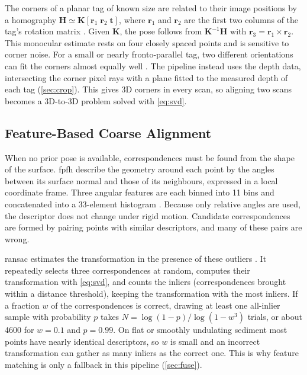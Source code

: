 The corners of a planar tag of known size are related to their image positions by a homography $\mathbf{H}\simeq\mathbf{K}[\mathbf{r}_1\;\mathbf{r}_2\;\mathbf{t}]$, where $\mathbf{r}_1$ and $\mathbf{r}_2$ are the first two columns of the tag's rotation matrix \cite{zhangFlexibleNewTechnique2000,hartley2003multiple}. Given $\mathbf{K}$, the pose follows from $\mathbf{K}^{-1}\mathbf{H}$ with $\mathbf{r}_3=\mathbf{r}_1\times\mathbf{r}_2$. This monocular estimate rests on four closely spaced points and is sensitive to corner noise. For a small or nearly fronto-parallel tag, two different orientations can fit the corners almost equally well \cite{schweighoferRobustPoseEstimation2006}. The pipeline instead uses the depth data, intersecting the corner pixel rays with a plane fitted to the measured depth of each tag (\autoref{sec:crop}). This gives 3D corners in every scan, so aligning two scans becomes a 3D-to-3D problem solved with \autoref{eq:svd}.

\subsection{Feature-Based Coarse Alignment}
\label{sec:theory_fpfh}
When no prior pose is available, correspondences must be found from the shape of the surface. \gls{fpfh} describe the geometry around each point by the angles between its surface normal and those of its neighbours, expressed in a local coordinate frame. Three angular features are each binned into 11 bins and concatenated into a 33-element histogram \cite{rusuFastPointFeature2009}. Because only relative angles are used, the descriptor does not change under rigid motion. Candidate correspondences are formed by pairing points with similar descriptors, and many of these pairs are wrong.

\Gls{ransac} estimates the transformation in the presence of these outliers \cite{fischlerRandomSampleConsensus1981}. It repeatedly selects three correspondences at random, computes their transformation with \autoref{eq:svd}, and counts the inliers (correspondences brought within a distance threshold), keeping the transformation with the most inliers. If a fraction $w$ of the correspondences is correct, drawing at least one all-inlier sample with probability $p$ takes $N=\log(1-p)/\log(1-w^{3})$ trials, or about 4600 for $w=0.1$ and $p=0.99$. On flat or smoothly undulating sediment most points have nearly identical descriptors, so $w$ is small and an incorrect transformation can gather as many inliers as the correct one. This is why feature matching is only a fallback in this pipeline (\autoref{sec:fuse}).


